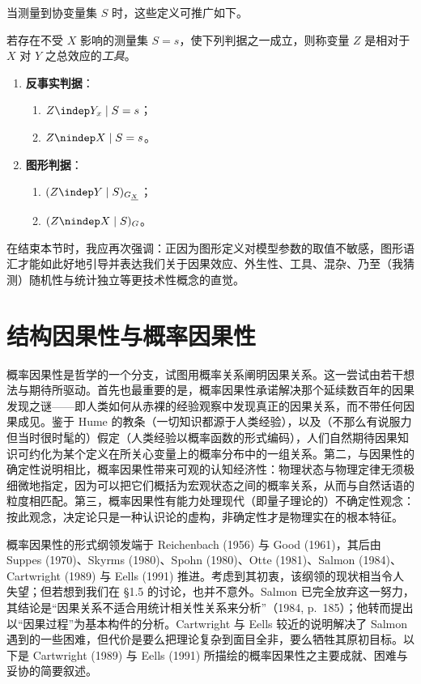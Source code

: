当测量到协变量集 $S$ 时，这些定义可推广如下。

\begin{definition}[工具]
若存在不受 $X$ 影响的测量集 $S=s$，使下列判据之一成立，则称变量 $Z$ 是相对于 $X$ 对 $Y$ 之总效应的\emph{工具}。
\begin{enumerate}[label=\arabic*.,leftmargin=1.9em]
\item \textbf{反事实判据}：
\begin{enumerate}[label=(\roman*),leftmargin=2.4em]
\item $Z\indep Y_x\mid S=s$；
\item $Z\nindep X\mid S=s$。
\end{enumerate}
\item \textbf{图形判据}：
\begin{enumerate}[label=(\roman*),leftmargin=2.4em]
\item $(Z\indep Y\mid S)_{G_{\underline{X}}}$；
\item $(Z\nindep X\mid S)_G$。
\end{enumerate}
\end{enumerate}
\end{definition}

在结束本节时，我应再次强调：正因为图形定义对模型参数的取值不敏感，图形语汇才能如此好地引导并表达我们关于因果效应、外生性、工具、混杂、乃至（我猜测）随机性与统计独立等更技术性概念的直觉。

\section{结构因果性与概率因果性}

概率因果性是哲学的一个分支，试图用概率关系阐明因果关系。这一尝试由若干想法与期待所驱动。首先也最重要的是，概率因果性承诺解决那个延续数百年的因果发现之谜——即人类如何从赤裸的经验观察中发现真正的因果关系，而不带任何因果成见。鉴于 Hume 的教条（一切知识都源于人类经验），以及（不那么有说服力但当时很时髦的）假定（人类经验以概率函数的形式编码），人们自然期待因果知识可约化为某个定义在所关心变量上的概率分布中的一组关系。第二，与因果性的确定性说明相比，概率因果性带来可观的认知经济性：物理状态与物理定律无须极细微地指定，因为可以把它们概括为宏观状态之间的概率关系，从而与自然话语的粒度相匹配。第三，概率因果性有能力处理现代（即量子理论的）不确定性观念：按此观念，决定论只是一种认识论的虚构，非确定性才是物理实在的根本特征。

概率因果性的形式纲领发端于 Reichenbach (1956) 与 Good (1961)，其后由 Suppes (1970)、Skyrms (1980)、Spohn (1980)、Otte (1981)、Salmon (1984)、Cartwright (1989) 与 Eells (1991) 推进。考虑到其初衷，该纲领的现状相当令人失望；但若想到我们在 \S 1.5 的讨论，也并不意外。Salmon 已完全放弃这一努力，其结论是“因果关系不适合用统计相关性关系来分析”（1984, p.~185）；他转而提出以“因果过程”为基本构件的分析。Cartwright 与 Eells 较近的说明解决了 Salmon 遇到的一些困难，但代价是要么把理论复杂到面目全非，要么牺牲其原初目标。以下是 Cartwright (1989) 与 Eells (1991) 所描绘的概率因果性之主要成就、困难与妥协的简要叙述。

